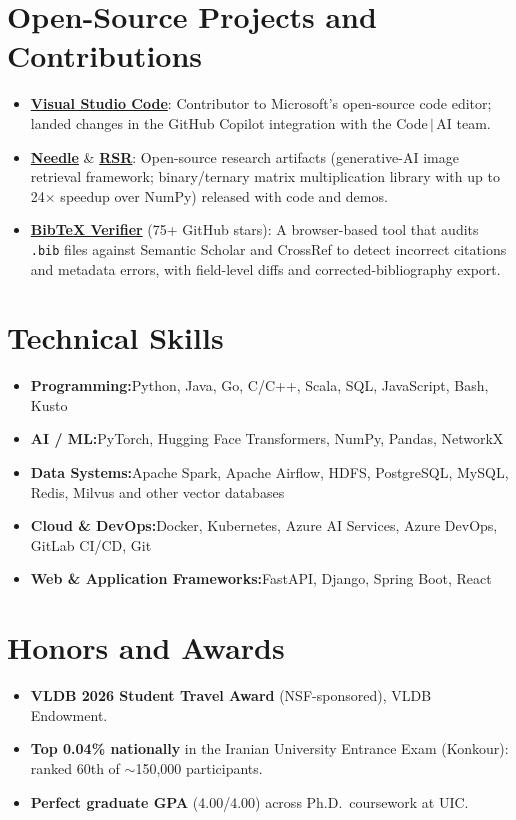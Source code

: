 \documentclass[a4paper,10pt]{article}
\newcommand{\resumeItem}[2]{
  \item{\textbf{#1}{\hspace{0.5mm}#2 \vspace{-0.2mm}}}
}
\newcommand{\resumeHeadingSkillStart}{\begin{itemize}[leftmargin=*,itemsep=1.2mm,rightmargin=2ex]}
\newcommand{\resumeHeadingSkillEnd}{\end{itemize}\vspace{-1mm}}
\begin{document}
\section{\textbf{Open-Source Projects and Contributions}}
\begin{itemize}[leftmargin=*,labelsep=1mm,itemsep=0.3mm]
  \item \textbf{\href{https://github.com/microsoft/vscode}{Visual Studio Code}}: Contributor to Microsoft's open-source code editor; landed changes in the GitHub Copilot integration with the Code\,$|$\,AI team.
  \item \textbf{\href{https://www.cs.uic.edu/~indexlab/Needle/overview.html}{Needle}} \& \textbf{\href{https://github.com/UIC-InDeXLab/RSR}{RSR}}: Open-source research artifacts (generative-AI image retrieval framework; binary/ternary matrix multiplication library with up to 24$\times$ speedup over NumPy) released with code and demos.
  \item \textbf{\href{https://github.com/merfanian/Bibtex-Verifier}{BibTeX Verifier}} (75+ GitHub stars): A browser-based tool that audits \texttt{.bib} files against Semantic Scholar and CrossRef to detect incorrect citations and metadata errors, with field-level diffs and corrected-bibliography export.
\end{itemize}
\vspace{-1mm}

\section{\textbf{Technical Skills}}
\resumeHeadingSkillStart
  \resumeItem{Programming:}{Python, Java, Go, C/C++, Scala, SQL, JavaScript, Bash, Kusto}
  \resumeItem{AI / ML:}{PyTorch, Hugging Face Transformers, NumPy, Pandas, NetworkX}
  \resumeItem{Data Systems:}{Apache Spark, Apache Airflow, HDFS, PostgreSQL, MySQL, Redis, Milvus and other vector databases}
  \resumeItem{Cloud \& DevOps:}{Docker, Kubernetes, Azure AI Services, Azure DevOps, GitLab CI/CD, Git}
  \resumeItem{Web \& Application Frameworks:}{FastAPI, Django, Spring Boot, React}
\resumeHeadingSkillEnd
\vspace{-0.5mm}

\section{\textbf{Honors and Awards}}
\begin{itemize}[leftmargin=*,labelsep=1mm,itemsep=0.3mm]
  \item \textbf{VLDB 2026 Student Travel Award} (NSF-sponsored), VLDB Endowment.
  \item \textbf{Top 0.04\% nationally} in the Iranian University Entrance Exam (Konkour): ranked 60th of $\sim$150{,}000 participants.
  \item \textbf{Perfect graduate GPA} (4.00/4.00) across Ph.D.\ coursework at UIC.
\end{itemize}
\vspace{-0.5mm}
\end{document}
